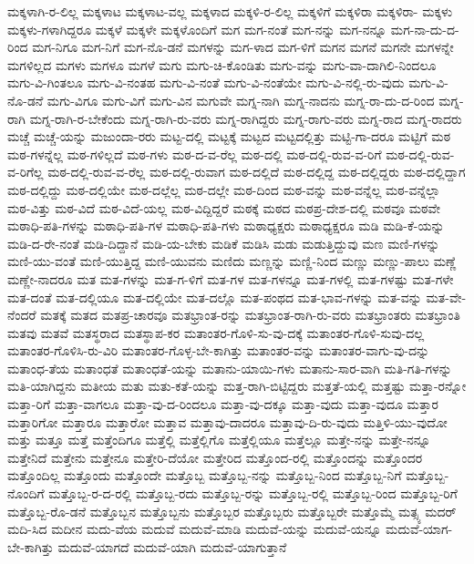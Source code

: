 {ಮಕ್ಕಳಾಗಿ-ರ-ಲಿಲ್ಲ
ಮಕ್ಕಳಾಟ
ಮಕ್ಕಳಾಟ-ವಲ್ಲ
ಮಕ್ಕಳಾದ
ಮಕ್ಕಳಿ-ರ-ಲಿಲ್ಲ
ಮಕ್ಕಳಿಗೆ
ಮಕ್ಕಳಿರಾ
ಮಕ್ಕಳಿರಾ-
ಮಕ್ಕಳು
ಮಕ್ಕಳು-ಗಳಾಗಿದ್ದರೂ
ಮಕ್ಕಳೆ
ಮಕ್ಕಳೇ
ಮಕ್ಕಳೊಂದಿಗೆ
ಮಗ
ಮಗ-ನಂತೆ
ಮಗ-ನನ್ನು
ಮಗ-ನನ್ನೂ
ಮಗ-ನಾ-ದು-ದ-ರಿಂದ
ಮಗ-ನಿಗೂ
ಮಗ-ನಿಗೆ
ಮಗ-ನೊ-ಡನೆ
ಮಗಳನ್ನು
ಮಗ-ಳಾದ
ಮಗ-ಳಿಗೆ
ಮಗನ
ಮಗನೆ
ಮಗನೇ
ಮಗಳನ್ನೇ
ಮಗಳಿಲ್ಲದ
ಮಗಳು
ಮಗಳೂ
ಮಗಳೆ
ಮಗು
ಮಗು-ಚಿ-ಕೊಂಡಿತು
ಮಗು-ವನ್ನು
ಮಗು-ವಾ-ದಾಗಿಲಿ-ನಿಂದಲೂ
ಮಗು-ವಿ-ಗಿಂತಲೂ
ಮಗು-ವಿ-ನಂತಹ
ಮಗು-ವಿ-ನಂತೆ
ಮಗು-ವಿ-ನಂತೆಯೇ
ಮಗು-ವಿ-ನಲ್ಲಿ-ರು-ವುದು
ಮಗು-ವಿ-ನೊ-ಡನೆ
ಮಗು-ವಿಗೂ
ಮಗು-ವಿಗೆ
ಮಗು-ವಿನ
ಮಗುವೇ
ಮಗ್ನ-ನಾಗಿ
ಮಗ್ನ-ನಾದನು
ಮಗ್ನ-ರಾ-ದು-ದ-ರಿಂದ
ಮಗ್ನ-ರಾಗಿ
ಮಗ್ನ-ರಾಗಿ-ರ-ಬೇಕೆಂದು
ಮಗ್ನ-ರಾಗಿ-ರು-ವರು
ಮಗ್ನ-ರಾಗಿದ್ದರು
ಮಗ್ನ-ರಾಗು-ವರು
ಮಗ್ನ-ರಾದ
ಮಗ್ನ-ರಾದರು
ಮಚ್ಚೆ
ಮಚ್ಚೆ-ಯನ್ನು
ಮಜುಂದಾ-ರರು
ಮಟ್ಟ-ದಲ್ಲಿ
ಮಟ್ಟಕ್ಕೆ
ಮಟ್ಟದ
ಮಟ್ಟದಲ್ಲಿತ್ತು
ಮಟ್ಟಿ-ಗಾ-ದರೂ
ಮಟ್ಟಿಗೆ
ಮಠ
ಮಠ-ಗಳನ್ನೆಲ್ಲ
ಮಠ-ಗಳಿಲ್ಲದೆ
ಮಠ-ಗಳು
ಮಠ-ದ-ವ-ರೆಲ್ಲ
ಮಠ-ದಲ್ಲಿ
ಮಠ-ದಲ್ಲಿ-ರುವ-ವ-ರಿಗೆ
ಮಠ-ದಲ್ಲಿ-ರುವ-ವ-ರಿಗೆಲ್ಲ
ಮಠ-ದಲ್ಲಿ-ರುವ-ವ-ರೆಲ್ಲ
ಮಠ-ದಲ್ಲಿ-ರುವಾಗ
ಮಠ-ದಲ್ಲಿದೆ
ಮಠ-ದಲ್ಲಿದ್ದ
ಮಠ-ದಲ್ಲಿದ್ದರು
ಮಠ-ದಲ್ಲಿದ್ದಾಗ
ಮಠ-ದಲ್ಲಿದ್ದು
ಮಠ-ದಲ್ಲಿಯೇ
ಮಠ-ದಲ್ಲೆಲ್ಲ
ಮಠ-ದಲ್ಲೇ
ಮಠ-ದಿಂದ
ಮಠ-ವನ್ನು
ಮಠ-ವನ್ನೆಲ್ಲ
ಮಠ-ವನ್ನೆಲ್ಲಾ
ಮಠ-ವಿತ್ತು
ಮಠ-ವಿದೆ
ಮಠ-ವಿದೆ-ಯಲ್ಲ
ಮಠ-ವಿದ್ದಿದ್ದರೆ
ಮಠಕ್ಕೆ
ಮಠದ
ಮಠಪ್ರ-ದೇಶ-ದಲ್ಲಿ
ಮಠವೂ
ಮಠವೇ
ಮಠಾಧಿ-ಪತಿ-ಗಳನ್ನು
ಮಠಾಧಿ-ಪತಿ-ಗಳ
ಮಠಾಧಿ-ಪತಿ-ಗಳು
ಮಠಾಧ್ಯಕ್ಷರು
ಮಠಾಧ್ಯಕ್ಷರೂ
ಮಡಿ
ಮಡಿ-ಕೆ-ಯನ್ನು
ಮಡಿ-ದ-ರೇ-ನಂತೆ
ಮಡಿ-ದಿದ್ದಾನೆ
ಮಡಿ-ಯ-ಬೇಕು
ಮಡಿಕೆ
ಮಡಿಸಿ
ಮಡು
ಮಡುತ್ತಿದ್ದುವು
ಮಣ
ಮಣಿ-ಗಳನ್ನು
ಮಣಿ-ಯು-ವಂತೆ
ಮಣಿ-ಯುತ್ತಿದ್ದ
ಮಣಿ-ಯುವನು
ಮಣಿದು
ಮಣ್ಣನ್ನು
ಮಣ್ಣಿ-ನಿಂದ
ಮಣ್ಣು
ಮಣ್ಣು-ಪಾಲು
ಮಣ್ಣೆ
ಮಣ್ಣೇ-ನಾದರೂ
ಮತ
ಮತ-ಗಳನ್ನು
ಮತ-ಗ-ಳಿಗೆ
ಮತ-ಗಳ
ಮತ-ಗಳನ್ನೂ
ಮತ-ಗಳಲ್ಲಿ
ಮತ-ಗಳಷ್ಟು
ಮತ-ಗಳೇ
ಮತ-ದಂತೆ
ಮತ-ದಲ್ಲಿಯೂ
ಮತ-ದಲ್ಲಿಯೇ
ಮತ-ದಲ್ಲೊ
ಮತ-ಪಂಥದ
ಮತ-ಭಾವ-ಗಳನ್ನು
ಮತ-ವನ್ನು
ಮತ-ವೇ-ನೆಂದರೆ
ಮತಕ್ಕೆ
ಮತದ
ಮತಪ್ರ-ಚಾರವೂ
ಮತಭ್ರಾಂತ-ರನ್ನು
ಮತಭ್ರಾಂತ-ರಾಗಿ-ರು-ವರು
ಮತಭ್ರಾಂತರು
ಮತಭ್ರಾಂತಿ
ಮತವು
ಮತವೆ
ಮತಸ್ಥರಾದ
ಮತಸ್ಥಾಪ-ಕರ
ಮತಾಂತರ-ಗೊಳಿ-ಸು-ವು-ದಕ್ಕೆ
ಮತಾಂತರ-ಗೊಳಿ-ಸುವು-ದಲ್ಲ
ಮತಾಂತರ-ಗೊಳಿಸಿ-ರು-ವಿರಿ
ಮತಾಂತರ-ಗೊಳ್ಳ-ಬೇ-ಕಾಗಿತ್ತು
ಮತಾಂತರ-ವನ್ನು
ಮತಾಂತರ-ವಾಗು-ವು-ದನ್ನು
ಮತಾಂಧ-ತೆಯ
ಮತಾಂಧತೆ
ಮತಾಂಧತೆ-ಯನ್ನು
ಮತಾನು-ಯಾಯಿ-ಗಳು
ಮತಾನು-ಸಾರ-ವಾಗಿ
ಮತಿ-ಗತಿ-ಗಳನ್ನು
ಮತಿ-ಯಾಗಿದ್ದನು
ಮತೀಯ
ಮತು
ಮತು-ಕತೆ-ಯನ್ನು
ಮತ್ತ-ರಾಗಿ-ಬಿಟ್ಟಿದ್ದರು
ಮತ್ತತೆ-ಯಲ್ಲಿ
ಮತ್ತಷ್ಟು
ಮತ್ತಾ-ರನ್ನೋ
ಮತ್ತಾ-ರಿಗೆ
ಮತ್ತಾ-ವಾಗಲೂ
ಮತ್ತಾ-ವು-ದ-ರಿಂದಲೂ
ಮತ್ತಾ-ವು-ದಕ್ಕೂ
ಮತ್ತಾ-ವುದು
ಮತ್ತಾ-ವುದೂ
ಮತ್ತಾರ
ಮತ್ತಾರಿಗೋ
ಮತ್ತಾರೂ
ಮತ್ತಾರೋ
ಮತ್ತಾವ
ಮತ್ತಾವು-ದಾದರೂ
ಮತ್ತಾವು-ದಿ-ರು-ವುದು
ಮತ್ತಿಳಿ-ಯು-ವುದೋ
ಮತ್ತು
ಮತ್ತೂ
ಮತ್ತೆ
ಮತ್ತೆಂದಿಗೂ
ಮತ್ತೆಲ್ಲಿ
ಮತ್ತೆಲ್ಲಿಗೊ
ಮತ್ತೆಲ್ಲಿಯೂ
ಮತ್ತೆಲ್ಲೂ
ಮತ್ತೇ-ನನ್ನು
ಮತ್ತೇ-ನನ್ನೂ
ಮತ್ತೇನಿದೆ
ಮತ್ತೇನು
ಮತ್ತೇನೂ
ಮತ್ತೇರಿ-ದೆಯೋ
ಮತ್ತೇರಿದ
ಮತ್ತೊಂದ-ರಲ್ಲಿ
ಮತ್ತೊಂದನ್ನು
ಮತ್ತೊಂದರ
ಮತ್ತೊಂದಿಲ್ಲ
ಮತ್ತೊಂದು
ಮತ್ತೊಂದೇ
ಮತ್ತೊಬ್ಬ
ಮತ್ತೊಬ್ಬ-ನನ್ನು
ಮತ್ತೊಬ್ಬ-ನಿಂದ
ಮತ್ತೊಬ್ಬ-ನಿಗೆ
ಮತ್ತೊಬ್ಬ-ನೊಂದಿಗೆ
ಮತ್ತೊಬ್ಬ-ರ-ದ-ರಲ್ಲಿ
ಮತ್ತೊಬ್ಬ-ರದು
ಮತ್ತೊಬ್ಬ-ರನ್ನು
ಮತ್ತೊಬ್ಬ-ರಲ್ಲಿ
ಮತ್ತೊಬ್ಬ-ರಿಂದ
ಮತ್ತೊಬ್ಬ-ರಿಗೆ
ಮತ್ತೊಬ್ಬ-ರೊ-ಡನೆ
ಮತ್ತೊಬ್ಬನ
ಮತ್ತೊಬ್ಬನು
ಮತ್ತೊಬ್ಬರ
ಮತ್ತೊಬ್ಬರು
ಮತ್ತೊಬ್ಬರೇ
ಮತ್ತೊಮ್ಮೆ
ಮತ್ಸ್ಯ
ಮದರ್
ಮದಿ-ಸಿದ
ಮದೀನ
ಮದು-ವೆಯ
ಮದುವೆ
ಮದುವೆ-ಮಾಡಿ
ಮದುವೆ-ಯನ್ನು
ಮದುವೆ-ಯನ್ನೂ
ಮದುವೆ-ಯಾಗ-ಬೇ-ಕಾಗಿತ್ತು
ಮದುವೆ-ಯಾಗದೆ
ಮದುವೆ-ಯಾಗಿ
ಮದುವೆ-ಯಾಗುತ್ತಾನೆ
}
